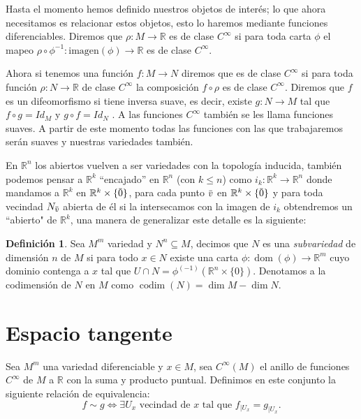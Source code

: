 \documentclass{report}
\theoremstyle{definition}
\newtheorem{defi}[theorem]{Definici\'on}
\DeclareMathOperator{\cod}{codim}
\DeclareMathOperator{\dom}{dom}
\newcommand{\overbar}[1]{\mkern 1.5mu\overline{\mkern-1.5mu#1\mkern-1.5mu}\mkern 1.5mu}
\begin{document}
Hasta el momento hemos definido nuestros objetos de inter\'es; lo que ahora necesitamos es relacionar estos objetos, esto lo haremos mediante funciones diferenciables. Diremos que $\rho: M \to \mathbb{R}$ es de clase $C^\infty$ si para toda carta $\phi$ el mapeo $\rho \circ \phi^{-1}: \text{imagen}(\phi) \to \mathbb{R}$ es de clase $C^\infty$.

Ahora si tenemos una funci\'on $f:M \to N$ diremos que es de clase $C^\infty$ si para toda funci\'on $\rho: N \to \mathbb{R}$ de clase $C^\infty$ la composici\'on $f \circ \rho$ es de clase $C^\infty$. Diremos que $f$ es un difeomorfismo si tiene inversa suave, es decir, existe $g:N \to M$ tal que $f \circ g = Id_{M}$ y $g \circ f = Id_N$ . A las funciones $C^\infty$ tambi\'en se les llama funciones suaves. A partir de este momento todas las funciones con las que trabajaremos ser\'an suaves y nuestras variedades tambi\'en.

En $\mathbb{R}^n$ los abiertos vuelven a ser variedades con la topolog\'ia inducida, tambi\'en podemos pensar a $\mathbb{R}^k$ ``encajado''  en $\mathbb{R}^n$ (con $k \leq n$) como $i_k: \mathbb{R}^k \to \mathbb{R}^n$ donde mandamos a $\mathbb{R}^k$ en $\mathbb{R}^k \times \{ \overbar{ 0} \}$, para cada punto $\overbar{v}$ en $\mathbb{R}^k \times  \{ \overbar{0} \}$ y para toda vecindad $N_{\overbar{v}}$ abierta de \'el si la intersecamos con la imagen de $i_k$ obtendremos un ``abierto" de $\mathbb{R}^k$, una manera de generalizar este detalle es la siguiente:

\begin{defi} Sea $M^m$ variedad y $N^n \subseteq M$, decimos que $N$ es una \textit{subvariedad} de dimensi\'on $n$ de $M$ si para todo $x \in N$ existe una carta $\phi: \dom (\phi) \to \mathbb{R}^m$ cuyo dominio contenga a $x$ tal que $U \cap N = \phi^{(-1)} (\mathbb{R}^n \times \{ 0 \}) $. Denotamos a la codimensi\'on de $N$ en $M$ como $\cod (N) = \dim M - \dim N$. 
\end{defi}




\section{Espacio tangente}

Sea $M^m$ una variedad diferenciable y $x \in M$, sea $C^\infty (M)$ el anillo de funciones $C^\infty$ de $M$ a $\mathbb{R}$ con la suma y producto puntual. Definimos en este conjunto la siguiente relaci\'on de equivalencia: $$f \sim g \iff \exists U_x \text{ vecindad de } x \text{ tal que }f_{\vert U_x} = g_{\vert U_x} . $$
\end{document}
